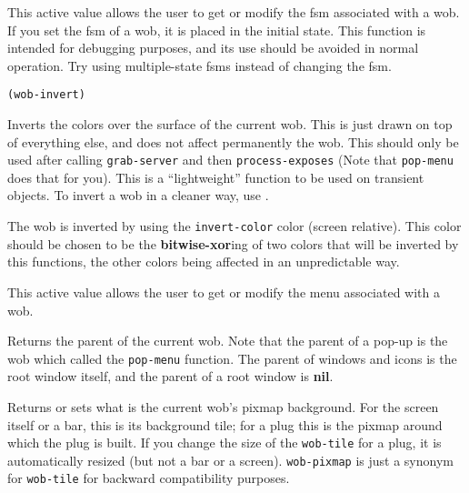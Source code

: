 This active value allows the user to get or  modify the fsm associated with
a wob.  If you set the fsm of a wob, it is placed in the initial state.
This function is intended for debugging purposes, and its use should be
avoided in normal operation. Try using multiple-state fsms instead of
changing the fsm.

        
{\usagefont\begin{verbatim}
(wob-invert)
\end{verbatim}}\usageupspace

Inverts the colors over the surface of the
current wob. This is just drawn on top of everything
else, and does not affect permanently the wob. This should only be used after
calling \verb"grab-server" and then \verb"process-exposes"
(Note that \verb"pop-menu" does that for you).
This is a ``lightweight'' function to be used on transient objects.
To invert a wob in a cleaner way, use .

The wob is inverted by using the \verb"invert-color" color (screen relative).
This color should be chosen to be the {\bf bitwise-xor}ing of two colors
that will be inverted by this functions, the other colors being affected
in an unpredictable way.

        

This active value allows the user to get or 
modify the menu associated with a wob.

        

Returns the parent of the current wob.  Note that the parent of a pop-up is
the wob which called the \verb"pop-menu" function. The parent of windows and
icons is the root window itself, and the parent of a root window is {\bf nil}.

        

Returns or sets what is the current wob's pixmap background. For the screen
itself or a bar, this is its background tile; for a plug this is
the pixmap around which the plug is built. If you change the size of the
\verb"wob-tile" for a plug, it is automatically resized (but not a bar
or a screen). \verb"wob-pixmap" is just a synonym for \verb"wob-tile"
for backward compatibility purposes.

